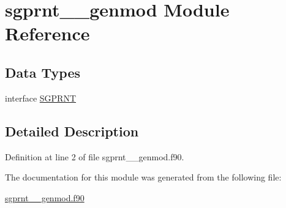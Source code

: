 \hypertarget{classsgprnt____genmod}{\section{sgprnt\+\_\+\+\_\+genmod Module Reference}
\label{classsgprnt____genmod}
}
\subsection*{Data Types}
\begin{DoxyCompactItemize}
\item 
interface \hyperlink{interfacesgprnt____genmod_1_1SGPRNT}{S\+G\+P\+R\+N\+T}
\end{DoxyCompactItemize}


\subsection{Detailed Description}


Definition at line 2 of file sgprnt\+\_\+\+\_\+genmod.\+f90.



The documentation for this module was generated from the following file\+:\begin{DoxyCompactItemize}
\item 
\hyperlink{sgprnt____genmod_8f90}{sgprnt\+\_\+\+\_\+genmod.\+f90}\end{DoxyCompactItemize}
